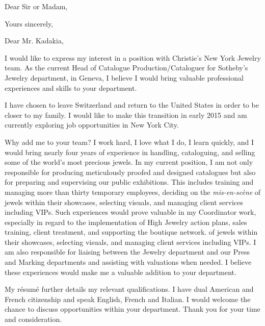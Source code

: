 
\date{June 28, 2014}
\opening{Dear Sir or Madam,}
\closing{Yours sincerely,}
\makelettertitle

Dear Mr. Kadakia,

I would like to express my interest in a position with Christie’s New York Jewelry team.  As the current Head of Catalogue Production/Cataloguer for Sotheby’s Jewelry department, in Geneva, I believe I would bring valuable professional experiences and skills to your department.

I have chosen to leave Switzerland and return to the United States in order to be closer to my family.   I would like to make this transition in early 2015 and am currently exploring job opportunities in New York City.

Why add me to your team?  I work hard, I love what I do, I learn quickly, and I would bring nearly four years of experience in handling, cataloguing, and selling some of the world’s most precious jewels.  In my current position, I am not only responsible for producing meticulously proofed and designed catalogues but also for preparing and supervising our public exhibitions.  This includes training and managing more than thirty temporary employees, deciding on the \textit{mis-en-sc\`{e}ne} of jewels within their showcases, selecting visuals, and managing client services including VIPs. Such experiences would prove valuable in my Coordinator work, especially in regard to the implementation of High Jewelry action plans, sales training, client treatment, and supporting the boutique network.
of jewels within their showcases, selecting visuals, and managing client services including VIPs.  I am also responsible for liaising between the Jewelry department and our Press and Marking departments and assisting with valuations when needed.  I believe these experiences would make me a valuable addition to your department.

My r\'{e}sum\'{e} further details my relevant qualifications. I have dual American and French citizenship and speak English, French and Italian. I would welcome the chance to discuss opportunities within your department. Thank you for your time and consideration.


\makeletterclosing

